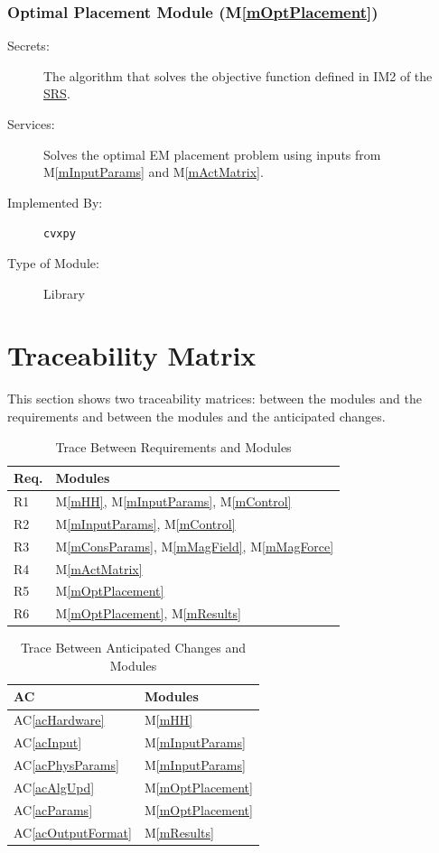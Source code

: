 \documentclass[12pt, titlepage]{article}
\newcommand{\acref}[1]{AC\ref{#1}}
\newcommand{\mref}[1]{M\ref{#1}}
\begin{document}
\subsubsection{Optimal Placement Module (\mref{mOptPlacement})}
\begin{description}
  \item[Secrets:]The algorithm that solves the objective function defined in IM2 of the \href{https://github.com/husseinsd1/optimal-em-arrangement/blob/main/docs/SRS/SRS.pdf}{SRS}.
  \item[Services:]Solves the optimal EM placement problem using inputs from \mref{mInputParams} and \mref{mActMatrix}.
  \item[Implemented By:] \texttt{cvxpy}
  \item[Type of Module:] Library
\end{description}

\section{Traceability Matrix} \label{SecTM}

This section shows two traceability matrices: between the modules and the
requirements and between the modules and the anticipated changes.

\begin{table}[H]
\centering
\begin{tabular}{p{} p{}}
\toprule
\textbf{Req.} & \textbf{Modules}\\
\midrule
R1 & \mref{mHH}, \mref{mInputParams}, \mref{mControl}\\
R2 & \mref{mInputParams}, \mref{mControl}\\
R3 & \mref{mConsParams}, \mref{mMagField}, \mref{mMagForce}\\
R4 & \mref{mActMatrix}\\
R5 & \mref{mOptPlacement}\\
R6 & \mref{mOptPlacement}, \mref{mResults}\\
\bottomrule
\end{tabular}
\caption{Trace Between Requirements and Modules}
\label{TblRT}
\end{table}

\begin{table}[H]
\centering
\begin{tabular}{p{} p{}}
\toprule
\textbf{AC} & \textbf{Modules}\\
\midrule
\acref{acHardware} & \mref{mHH}\\
\acref{acInput} & \mref{mInputParams}\\
\acref{acPhysParams} & \mref{mInputParams}\\
\acref{acAlgUpd} & \mref{mOptPlacement}\\
\acref{acParams} & \mref{mOptPlacement}\\
\acref{acOutputFormat} & \mref{mResults}\\
\bottomrule
\end{tabular}
\caption{Trace Between Anticipated Changes and Modules}
\label{TblACT}
\end{table}
\end{document}
